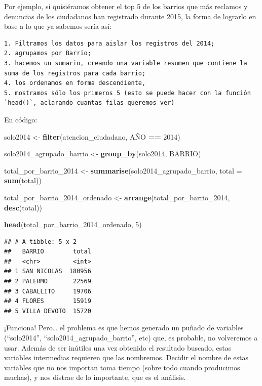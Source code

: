 \documentclass[]{book}
\newenvironment{Shaded}{\begin{snugshade}}{\end{snugshade}}
\newcommand{\KeywordTok}[1]{\textcolor[rgb]{0.13,0.29,0.53}{\textbf{#1}}}
\newcommand{\DataTypeTok}[1]{\textcolor[rgb]{0.13,0.29,0.53}{#1}}
\newcommand{\DecValTok}[1]{\textcolor[rgb]{0.00,0.00,0.81}{#1}}
\newcommand{\StringTok}[1]{\textcolor[rgb]{0.31,0.60,0.02}{#1}}
\newcommand{\OperatorTok}[1]{\textcolor[rgb]{0.81,0.36,0.00}{\textbf{#1}}}
\newcommand{\NormalTok}[1]{#1}
\begin{document}
Por ejemplo, si quisiéramos obtener el top 5 de los barrios que más
reclamos y denuncias de los ciudadanos han registrado durante 2015, la
forma de lograrlo en base a lo que ya sabemos sería así:

\begin{verbatim}
1. Filtramos los datos para aislar los registros del 2014;
2. agrupamos por Barrio;
3. hacemos un sumario, creando una variable resumen que contiene la suma de los registros para cada barrio;
4. los ordenamos en forma descendiente,
5. mostramos sólo los primeros 5 (esto se puede hacer con la función `head()`, aclarando cuantas filas queremos ver)
\end{verbatim}

En código:

\begin{Shaded}
\begin{Highlighting}[]
\NormalTok{solo2014 <-}\StringTok{ }\KeywordTok{filter}\NormalTok{(atencion_ciudadano, AÑO }\OperatorTok{==}\StringTok{ }\DecValTok{2014}\NormalTok{)}

\NormalTok{solo2014_agrupado_barrio <-}\StringTok{ }\KeywordTok{group_by}\NormalTok{(solo2014, BARRIO)}

\NormalTok{total_por_barrio_}\DecValTok{2014}\NormalTok{ <-}\StringTok{ }\KeywordTok{summarise}\NormalTok{(solo2014_agrupado_barrio, }\DataTypeTok{total =} \KeywordTok{sum}\NormalTok{(total))}

\NormalTok{total_por_barrio_2014_ordenado <-}\StringTok{ }\KeywordTok{arrange}\NormalTok{(total_por_barrio_}\DecValTok{2014}\NormalTok{, }\KeywordTok{desc}\NormalTok{(total))}

\KeywordTok{head}\NormalTok{(total_por_barrio_2014_ordenado, }\DecValTok{5}\NormalTok{)}
\end{Highlighting}
\end{Shaded}

\begin{verbatim}
## # A tibble: 5 x 2
##   BARRIO        total
##   <chr>         <int>
## 1 SAN NICOLAS  180956
## 2 PALERMO       22569
## 3 CABALLITO     19706
## 4 FLORES        15919
## 5 VILLA DEVOTO  15720
\end{verbatim}

¡Funciona! Pero\ldots{} el problema es que hemos generado un puñado de
variables (``solo2014'', ``solo2014\_agrupado\_barrio'', etc) que, es
probable, no volveremos a usar. Además de ser inútiles una vez obtenido
el resultado buscado, estas variables intermedias requieren que las
nombremos. Decidir el nombre de estas variables que no nos importan toma
tiempo (sobre todo cuando producimos muchas), y nos distrae de lo
importante, que es el análisis.
\end{document}
